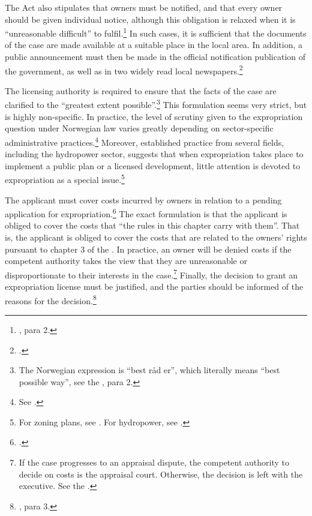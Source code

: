 The Act also stipulates that owners must be notified, and that every owner should be given individual notice, although this obligation is relaxed when it is ``unreasonable difficult'' to fulfil.\footnote{\dni\cite[12]{ea59}, para 2.} In such cases, it is sufficient that the documents of the case are made available at a suitable place in the local area. In addition, a public announcement must then  be made in the official notification publication of the government, as well as in two widely read local newspapers.\footnote{\dni\cite[12]{ea59}.}

The licensing authority is required to ensure that the facts of the case are clarified to the ``greatest extent possible''.\footnote{The Norwegian expression is ``best råd er'', which literally means ``best possible way'', see the \dni\cite[12]{ea59}, para 2.} This formulation seems very strict, but is highly non-specific. In practice, the level of scrutiny given to the expropriation question under Norwegian law varies greatly depending on sector-specific administrative practices.\footnote{See \cite[380-381]{dyrkolbotn15}.} Moreover, established practice from several fields, including the hydropower sector, suggests that when expropriation takes place to implement a public plan or a licensed development, little attention is devoted to expropriation as a special issue.\footnote{For zoning plans, see \cite{namsos98,bo99}. For hydropower, see \cite{jorpeland11}.}

The applicant must cover costs incurred by owners in relation to a pending application for expropriation.\footnote{\dni\cite[15]{ea59}.} The exact formulation is that the applicant is obliged to cover the costs that ``the rules in this chapter carry with them''. That is, the applicant is obliged to cover the costs that are related to the owners' rights pursuant to chapter 3 of the \cite{ea59}. In practice, an owner will be denied costs if the competent authority takes the view that they are unreasonable or disproportionate to their interests in the case.\footnote{If the case progresses to an appraisal dispute, the competent authority to decide on costs is the appraisal court. Otherwise, the decision is left with the executive. See the \dni\cite[15]{ea59}.} Finally, the decision to grant an expropriation license must be justified, and the parties should be informed of the reasons for the decision.\footnote{\dni\cite[12]{ea59}, para 3.}

